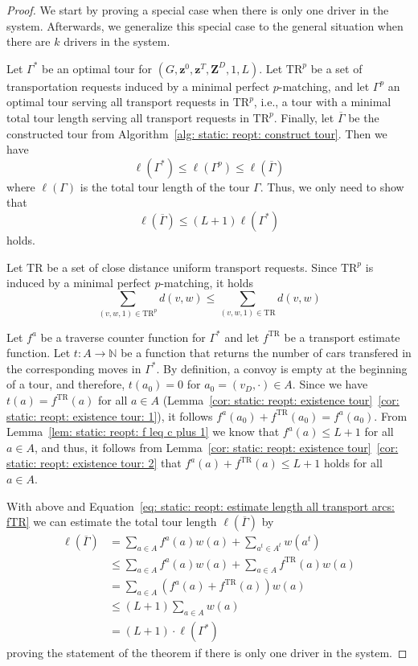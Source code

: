 \documentclass[english]{llncs}
\numberwithin{sublemma}{lemma}
\newcommand{\NN}{\ensuremath{\mathbb{N}}}
\newcommand{\capd}{\ensuremath{L}}
\newcommand{\tourd}{\ensuremath{\Gamma}}
\newcommand{\TR}{\mathrm{TR}}
\newcommand{\z}{\boldsymbol{z}}
\newcommand{\zd}{\boldsymbol{Z}^D} \newcommand{\zzd}{Z^D}
\begin{document}
\begin{proof}
We start by proving a special case when there is only one driver in the system.
Afterwards, we generalize this special case to the general situation when there are $k$ drivers in the system.

Let $\tourd^*$ be an optimal tour for $(G,\z^0,\z^T,\zd,1,\capd)$.
Let $\TR^p$ be a set of transportation requests induced by a minimal perfect $p$-matching, and let $\tourd^p$ an optimal tour serving all transport requests in $\TR^p$,
i.e., a tour with a minimal total tour length serving all transport requests in $\TR^p$.
Finally, let $\overline{\tourd}$ be the constructed tour from Algorithm~\ref{alg: static: reopt: construct tour}.
Then we have
\[
 \ell(\tourd^*) \leq \ell(\tourd^p) \leq \ell(\overline{\tourd})
\]
where $\ell(\tourd)$ is the total tour length of the tour $\tourd$.
Thus, we only need to show that
\begin{equation}
  \ell(\overline{\tourd}) \leq (\capd + 1) \ell(\tourd^*)
\end{equation}
holds.

Let $\TR$ be a set of close distance uniform transport requests.
Since $\TR^p$ is induced by a minimal perfect $p$-matching, it holds
\[
 \sum_{(v, w, 1) \in \TR^p} d(v, w) \leq \sum_{(v, w, 1) \in \TR} d(v, w)
\]

Let $f^a$ be a traverse counter function for $\tourd^*$ and let $f^{\TR}$ be a transport estimate function.
Let $t : A \to \NN$ be a function that returns the number of cars transfered in the corresponding moves in $\tourd^*$.
By definition, a convoy is empty at the beginning of a tour, and therefore, $t(a_0) = 0$ for $a_0 = (v_D, \cdot) \in A$.
Since we have $t(a) = f^{\TR}(a)$ for all $a \in A$ (Lemma~\ref{cor: static: reopt: existence tour}~\ref{cor: static: reopt: existence tour: 1}),
it follows $f^a(a_0) + f^{\TR}(a_0) = f^a(a_0)$.
From Lemma~\ref{lem: static: reopt: f leq c plus 1} we know that $f^a(a) \leq \capd + 1$ for all $a \in A$,
and thus, it follows from Lemma~\ref{cor: static: reopt: existence tour}~\ref{cor: static: reopt: existence tour: 2} that $f^a(a) + f^{\TR}(a) \leq \capd + 1$ holds for all $a \in A$.

With above and Equation~\eqref{eq: static: reopt: estimate length all transport arcs: fTR} we can estimate the total tour length $\ell(\overline{\tourd})$ by
\begin{align*}
 \ell(\overline{\tourd}) & = \sum_{a \in A} f^a(a) w(a) + \sum_{a^t \in A^t} w(a^t) \\
                         & \leq \sum_{a \in A} f^a(a) w(a) + \sum_{a \in A} f^{\TR}(a) w(a)  \\
                         & = \sum_{a \in A} \left(f^a(a) + f^{\TR}(a) \right) w(a) \\
                         & \leq (\capd + 1) \sum_{a \in A} w(a) \\
                         & = (\capd + 1) \cdot \ell(\tourd^*)
\end{align*}
proving the statement of the theorem if there is only one driver in the system.




\end{proof}
\end{document}
